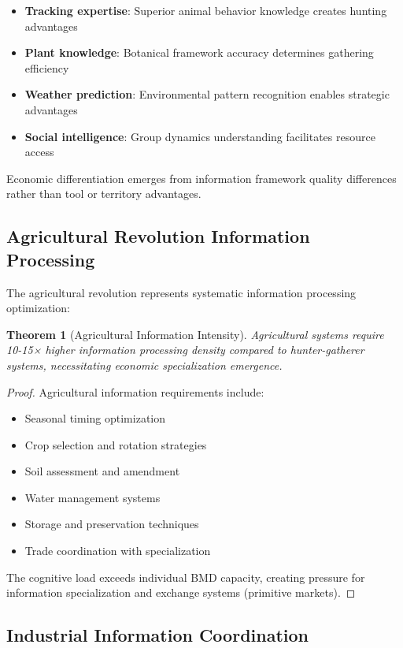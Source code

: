\documentclass[12pt,a4paper]{article}
\newtheorem{theorem}{Theorem}
\begin{document}
\begin{itemize}
\item \textbf{Tracking expertise}: Superior animal behavior knowledge creates hunting advantages
\item \textbf{Plant knowledge}: Botanical framework accuracy determines gathering efficiency
\item \textbf{Weather prediction}: Environmental pattern recognition enables strategic advantages
\item \textbf{Social intelligence}: Group dynamics understanding facilitates resource access
\end{itemize}

Economic differentiation emerges from information framework quality differences rather than tool or territory advantages.

\subsection{Agricultural Revolution Information Processing}

The agricultural revolution represents systematic information processing optimization:

\begin{theorem}[Agricultural Information Intensity]
Agricultural systems require 10-15× higher information processing density compared to hunter-gatherer systems, necessitating economic specialization emergence.
\end{theorem}

\begin{proof}
Agricultural information requirements include:
\begin{itemize}
\item Seasonal timing optimization
\item Crop selection and rotation strategies  
\item Soil assessment and amendment
\item Water management systems
\item Storage and preservation techniques
\item Trade coordination with specialization
\end{itemize}

The cognitive load exceeds individual BMD capacity, creating pressure for information specialization and exchange systems (primitive markets).
\end{proof}

\subsection{Industrial Information Coordination}
\end{document}
